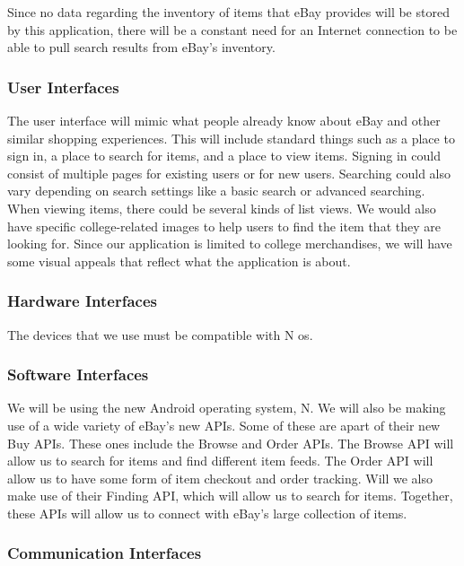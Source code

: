 \documentclass[journal,compsoc, 10pt, draftclsnofoot, onecolumn]{IEEEtran}
\begin{document}
Since no data regarding the inventory of items that eBay provides will be stored
 by this application, there will be a constant need for an Internet connection 
to be able to pull search results from eBay's inventory. 

\subsubsection{User Interfaces}

The user interface will mimic what people already know about eBay and other 
similar shopping experiences. This will include standard things such as a place 
to sign in, a place to search for items, and a place to view items. Signing in 
could consist of multiple pages for existing users or for new users. Searching 
could also vary depending on search settings like a basic search or advanced 
searching. When viewing items, there could be several kinds of list views. We 
would also have specific college-related images to help users to find the item 
that they are looking for. Since our application is limited to college 
merchandises, we will have some visual appeals that reflect what the application
 is about.

\subsubsection{Hardware Interfaces}

The devices that we use must be compatible with N os. 

\subsubsection{Software Interfaces}

We will be using the new Android operating system, N. We will also be making use
 of a wide variety of eBay's new APIs. Some of these are apart of their new Buy 
APIs. These ones include the Browse and Order APIs. The Browse API will allow us
 to search for items and find different item feeds. The Order API will allow us 
to have some form of item checkout and order tracking. Will we also make use of 
their Finding API, which will allow us to search for items. Together, these APIs
 will allow us to connect with eBay's large collection of items.

\subsubsection{Communication Interfaces}
\end{document}
